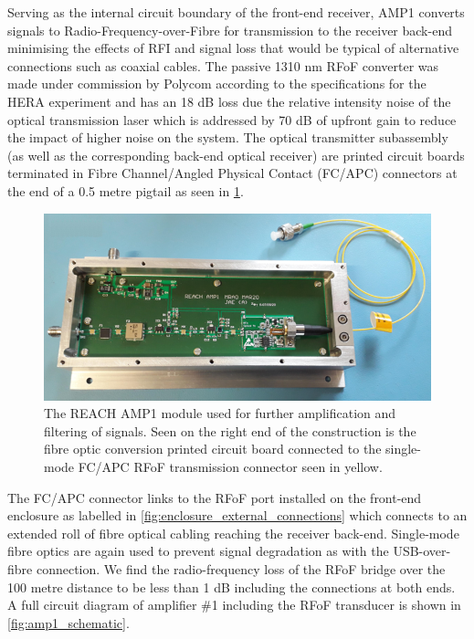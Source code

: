 Serving as the internal circuit boundary of the front-end receiver, AMP1 converts signals to Radio-Frequency-over-Fibre for transmission to the receiver back-end minimising the effects of RFI and signal loss that would be typical of alternative connections such as coaxial cables. The passive 1310 nm RFoF converter was made under commission by Polycom according to the specifications for the HERA experiment and has an 18 dB loss due the relative intensity noise of the optical transmission laser which is addressed by 70 dB of upfront gain to reduce the impact of higher noise on the system. The optical transmitter subassembly (as well as the corresponding back-end optical receiver) are printed circuit boards terminated in Fibre Channel/Angled Physical Contact (FC/APC) connectors at the end of a 0.5 metre pigtail as seen in \cref{fig:amp1}.
\begin{figure}
    \centering
    \includegraphics[scale=0.5]{amp1}
    \caption{The REACH AMP1 module used for further amplification and filtering of signals. Seen on the right end of the construction is the fibre optic conversion printed circuit board connected to the single-mode FC/APC RFoF transmission connector seen in yellow.}
    \label{fig:amp1}
\end{figure}
The FC/APC connector links to the RFoF port installed on the front-end enclosure as labelled in \cref{fig:enclosure_external_connections} which connects to an extended roll of fibre optical cabling reaching the receiver back-end. Single-mode fibre optics are again used to prevent signal degradation as with the USB-over-fibre connection. We find the radio-frequency loss of the RFoF bridge over the 100 metre distance to be less than 1 dB including the connections at both ends. A full circuit diagram of amplifier \#1 including the RFoF transducer is shown in \cref{fig:amp1_schematic}.


